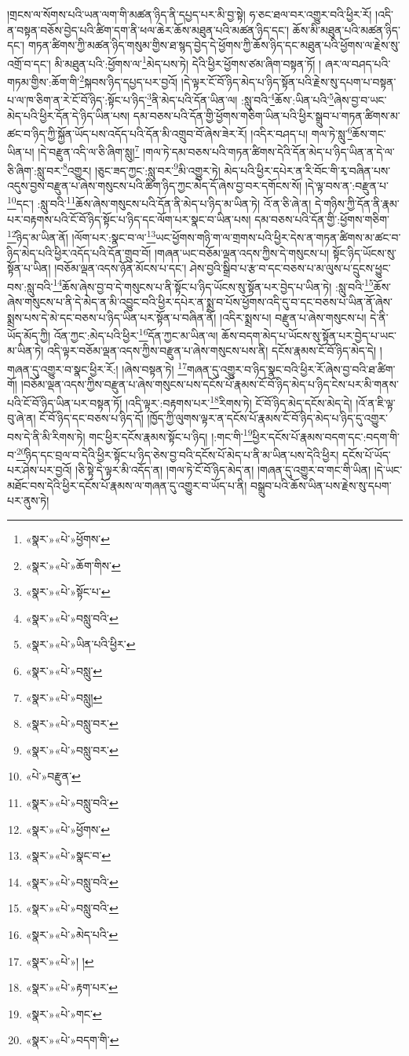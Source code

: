 །གྲངས་ལ་སོགས་པའི་ཡན་ལག་གི་མཚན་ཉིད་ནི་དཔྱད་པར་མི་བྱ་སྟེ། ཧ་ཅང་ཐལ་བར་འགྱུར་བའི་ཕྱིར་རོ། །འདི་ན་བསྟན་བཅོས་བྱེད་པའི་ཚིག་དག་ནི་ཕལ་ཆེར་ཆོས་མཐུན་པའི་མཚན་ཉིད་དང་། ཆོས་མི་མཐུན་པའི་མཚན་ཉིད་དང་། གཏན་ཚིགས་ཀྱི་མཚན་ཉིད་གསུམ་གྱིས་ཐ་སྙད་བྱེད་དེ་ཕྱོགས་ཀྱི་ཆོས་ཉིད་དང་མཐུན་པའི་ཕྱོགས་ལ་རྗེས་སུ་འགྲོ་བ་དང་། མི་མཐུན་པའི་:ཕྱོགས་ལ་\footnote{«སྣར་»«པེ་»ཕྱོགས་}མེད་པས་ཏེ། དེའི་ཕྱིར་ཕྱོགས་ཙམ་ཞིག་བསྟན་ཏོ། །
ཞར་ལ་བཤད་པའི་གཏམ་གྱིས་:ཆོག་གི་\footnote{«སྣར་»«པེ་»ཆོག་གིས་}སྐབས་ཉིད་དཔྱད་པར་བྱའོ། །དེ་ལྟར་ངོ་བོ་ཉིད་མེད་པ་ཉིད་སྟོན་པའི་རྗེས་སུ་དཔག་པ་བསྟན་པ་ལ་ཁ་ཅིག་ན་རེ་ངོ་བོ་ཉིད་:སྟོང་པ་ཉིད་\footnote{«སྣར་»«པེ་»སྟོང་པ་}ནི་མེད་པའི་དོན་ཡིན་ལ། :སླུ་བའི་\footnote{«སྣར་»«པེ་»བསླུ་བའི་}ཆོས་:ཡིན་པའི་\footnote{«སྣར་»«པེ་»ཡིན་པའི་ཕྱིར་}ཞེས་བྱ་བ་ཡང་མེད་པའི་ཕྱིར་དོན་དེ་ཉིད་ཡིན་པས། དམ་བཅས་པའི་དོན་གྱི་ཕྱོགས་གཅིག་ཡིན་པའི་ཕྱིར་སྒྲུབ་པ་གཏན་ཚིགས་མ་ཚང་བ་ཉིད་ཀྱི་སྐྱོན་ཡོད་པས་འདོད་པའི་དོན་མི་འགྲུབ་བོ་ཞེས་ཟེར་རོ། །འདིར་བཤད་པ། གལ་ཏེ་སླུ་\footnote{«སྣར་»«པེ་»བསླུ་}ཆོས་གང་ཡིན་པ། །དེ་བརྫུན་འདི་ལ་ཅི་ཞིག་སླུ།\footnote{«སྣར་»«པེ་»བསླུ།} །གལ་ཏེ་དམ་བཅས་པའི་གཏན་ཚིགས་དེའི་དོན་མེད་པ་ཉིད་ཡིན་ན་དེ་ལ་ཅི་ཞིག་:སླུ་བར་\footnote{«སྣར་»«པེ་»བསླུ་བར་}འགྱུར། །ཅུང་ཟད་ཀྱང་:སླུ་བར་\footnote{«སྣར་»«པེ་»བསླུ་བར་}མི་འགྱུར་ཏེ། མེད་པའི་ཕྱིར་དཔེར་ན་རི་བོང་གི་རྭ་བཞིན་པས་འདུས་བྱས་བརྫུན་པ་ཞེས་གསུངས་པའི་ཚིག་ཉིད་ཀྱང་མེད་དོ་ཞེས་བྱ་བར་དགོངས་སོ། །དེ་ལྟ་བས་ན་:བརྫུན་པ་\footnote{«པེ་»བརྫུན་}དང་། :སླུ་བའི་\footnote{«སྣར་»«པེ་»བསླུ་བའི་}ཆོས་ཞེས་གསུངས་པའི་དོན་ནི་མེད་པ་ཉིད་མ་ཡིན་ཏེ། འོ་ན་ཅི་ཞེ་ན། དེ་གཉིས་ཀྱི་དོན་ནི་རྣམ་པར་བརྟགས་པའི་ངོ་བོ་ཉིད་སྟོང་པ་ཉིད་དང་ལོག་པར་སྣང་བ་ཡིན་པས། དམ་བཅས་པའི་དོན་གྱི་:ཕྱོགས་གཅིག་\footnote{«སྣར་»«པེ་»ཕྱོགས་}ཉིད་མ་ཡིན་ནོ། །ལོག་པར་:སྣང་བ་ལ་\footnote{«སྣར་»«པེ་»སྣང་བ་}ཡང་ཕྱོགས་གཉི་ག་ལ་གྲགས་པའི་ཕྱིར་དེས་ན་གཏན་ཚིགས་མ་ཚང་བ་ཉིད་མེད་པའི་ཕྱིར་འདོད་པའི་དོན་གྲུབ་བོ། །གཞན་ཡང་བཅོམ་ལྡན་འདས་ཀྱིས་དེ་གསུངས་པ། སྟོང་ཉིད་ཡོངས་སུ་སྟོན་པ་ཡིན། །བཅོམ་ལྡན་འདས་ཉོན་མོངས་པ་དང་། ཤེས་བྱའི་སྒྲིབ་པ་རྩ་བ་དང་བཅས་པ་མ་ལུས་པ་དྲུངས་ཕྱུང་བས་:སླུ་བའི་\footnote{«སྣར་»«པེ་»བསླུ་བའི་}ཆོས་ཞེས་བྱ་བ་དེ་གསུངས་པ་ནི་སྟོང་པ་ཉིད་ཡོངས་སུ་སྟོན་པར་བྱེད་པ་ཡིན་ཏེ། :སླུ་བའི་\footnote{«སྣར་»«པེ་»བསླུ་བའི་}ཆོས་ཞེས་གསུངས་པ་ནི་དེ་མེད་ན་མི་འབྱུང་བའི་ཕྱིར་དཔེར་ན་སྨྲ་བ་པོས་ཕྱོགས་འདི་དུ་བ་དང་བཅས་པ་ཡིན་ནོ་ཞེས་སྨྲས་པས་དེ་མེ་དང་བཅས་པ་ཉིད་ཡིན་པར་སྟོན་པ་བཞིན་ནོ། །འདིར་སྨྲས་པ། བརྫུན་པ་ཞེས་གསུངས་པ། དེ་ནི་ཡོད་མོད་ཀྱི། འོན་ཀྱང་:མེད་པའི་ཕྱིར་\footnote{«སྣར་»«པེ་»མེད་པའི་}དོན་ཀྱང་མ་ཡིན་ལ། ཆོས་བདག་མེད་པ་ཡོངས་སུ་སྟོན་པར་བྱེད་པ་ཡང་མ་ཡིན་ཏེ། འདི་ལྟར་བཅོམ་ལྡན་འདས་ཀྱིས་བརྫུན་པ་ཞེས་གསུངས་པས་ནི། དངོས་རྣམས་ངོ་བོ་ཉིད་མེད་དེ། །གཞན་དུ་འགྱུར་བ་སྣང་ཕྱིར་རོ:། །ཞེས་བསྟན་ཏེ། \footnote{«སྣར་»«པེ་»། ། }གཞན་དུ་འགྱུར་བ་ཉིད་སྣང་བའི་ཕྱིར་རོ་ཞེས་བྱ་བའི་ཐ་ཚིག་གོ། །བཅོམ་ལྡན་འདས་ཀྱིས་བརྫུན་པ་ཞེས་གསུངས་པས་དངོས་པོ་རྣམས་ངོ་བོ་ཉིད་མེད་པ་ཉིད་ངེས་པར་མི་གནས་པའི་ངོ་བོ་ཉིད་ཡིན་པར་བསྟན་ཏོ། །འདི་ལྟར་:བརྟགས་པར་\footnote{«སྣར་»«པེ་»རྟག་པར་}རིགས་ཏེ། ངོ་བོ་ཉིད་མེད་དངོས་མེད་དེ། །འོ་ན་ཇི་ལྟ་བུ་ཞེ་ན། ངོ་བོ་ཉིད་དང་བཅས་པ་ཉིད་དོ། །ཁྱོད་ཀྱི་ལུགས་ལྟར་ན་དངོས་པོ་རྣམས་ངོ་བོ་ཉིད་མེད་པ་ཉིད་དུ་འགྱུར་བས་དེ་ནི་མི་རིགས་ཏེ། གང་ཕྱིར་དངོས་རྣམས་སྟོང་པ་ཉིད། །:གང་གི་\footnote{«སྣར་»«པེ་»གང་}ཕྱིར་དངོས་པོ་རྣམས་བདག་དང་:བདག་གི་བ་\footnote{«སྣར་»«པེ་»བདག་གི་}ཉིད་དང་བྲལ་བ་དེའི་ཕྱིར་སྟོང་པ་ཉིད་ཅེས་བྱ་བའི་དངོས་པོ་མེད་པ་ནི་མ་ཡིན་པས་དེའི་ཕྱིར། དངོས་པོ་ཡོད་པར་ཤེས་པར་བྱའོ། །ཅི་སྟེ་དེ་ལྟར་མི་འདོད་ན། །གལ་ཏེ་ངོ་བོ་ཉིད་མེད་ན། །གཞན་དུ་འགྱུར་བ་གང་གི་ཡིན། །དེ་ཡང་མཐོང་བས་དེའི་ཕྱིར་དངོས་པོ་རྣམས་ལ་གཞན་དུ་འགྱུར་བ་ཡོད་པ་ནི། བསྒྲུབ་པའི་ཆོས་ཡིན་པས་རྗེས་སུ་དཔག་པར་ནུས་ཏེ། 